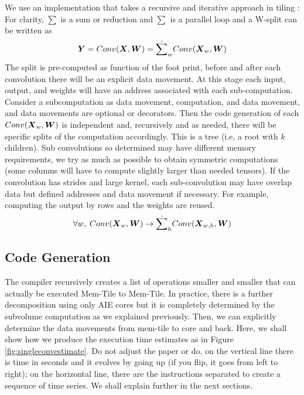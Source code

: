 \documentclass[sigconf]{acmart}
\begin{document}
We use an implementation that takes a recursive and iterative approach
in tiling \cite{abs-2110-04327}: For clarity, $\sum$ is a sum or
reduction and $\dot{\sum}$ is a parallel loop and a W-split can be
written as
\begin{equation}
  {\boldsymbol Y} =  Conv({\boldsymbol X},{\boldsymbol W}) = \dot{\sum}_w
  Conv({\boldsymbol X}_w,{\boldsymbol W})
\end{equation}
The split is pre-computed as function of the foot print, before and
after each convolution there will be an explicit data movement. At
this stage each input, output, and weights will have an address
associated with each sub-computation. Consider a subcomputation as
data movement, computation, and data movement, and data movements are
optional or decorators.  Then the code generation of each
$Conv({\boldsymbol X}_w,{\boldsymbol W})$ is independent and, recursively and as needed,
there will be specific splits of the computation accordingly. This is
a tree (i.e, a root with $k$ children). Sub convolutions so determined
may have different memory requirements, we try as much as possible to
obtain symmetric computations (some columns will have to compute
slightly larger than needed tensors). If the convolution has strides
and large kernel, each sub-convolution may have overlap data but
defined addresses and data movement if necessary. For example,
computing the output by rows and the weights are reused.
\begin{equation}
  \forall w, \;   Conv({\boldsymbol X}_w,{\boldsymbol W}) \rightarrow  \dot{\sum}_h Conv({\boldsymbol X}_{w,h},{\boldsymbol W})
\end{equation}





\subsection{Code Generation }
The compiler recursively creates a list of operations smaller and
smaller that can actually be executed Mem-Tile to Mem-Tile. In
practice, there is a further decomposition using only AIE cores but it
is completely determined by the subvolume computation as we explained
previously. Then, we can explicitly determine the data movements from
mem-tile to core and back. Here, we shall show how we produce the
execution time estimates as in Figure %
\ref{fig:singleconvestimate}.  Do
not adjust the paper or do, on the vertical line there is time in
seconds and it evolves by going up (if you flip, it goes from left to
right); on the horizontal line, there are the instructions separated
to create a sequence of time series. We shall explain further in the
next sections.
\end{document}

